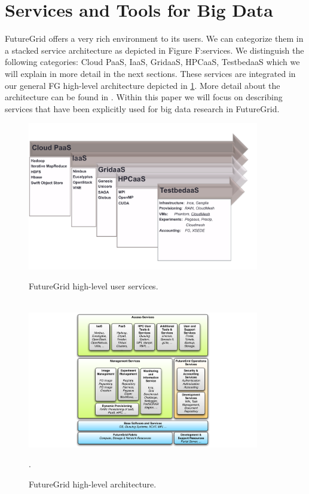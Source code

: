 \section{Services and Tools for Big Data}

FutureGrid offers a very rich environment to its users. We can categorize them in a stacked service architecture as depicted in 
Figure {F:services}. We distinguish the following categories: Cloud PaaS, IaaS, GridaaS, HPCaaS, TestbedaaS which we will explain in more detail in the next sections. These services are integrated in our general FG high-level architecture depicted in \ref{F:arch}. More detail about the architecture can be found in \cite{las2010gce,las12fg-bookchapter}. Within this paper we will focus on describing services that have been explicitly used for big data research in FutureGrid.

\begin{figure}[p]
  \centering
    \includegraphics[width=0.9\textwidth]{images/user-services.pdf}
  \caption{FutureGrid high-level user services.}\label{F:services}
  ~\\
  \centering
  \includegraphics[width=0.9\textwidth]{images/architecture.pdf}
  \caption{FutureGrid high-level architecture.}\label{F:arch}.
\end{figure}

